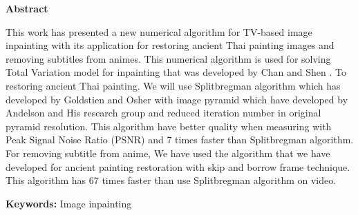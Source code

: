 \thispagestyle{empty}
\vspace{2 cm}
{\huge \bf Abstract}

\vspace{2 cm}
\hspace{1cm} This work has presented a new numerical algorithm for TV-based image inpainting with its application for restoring ancient Thai painting images and removing subtitles from animes. This numerical algorithm is used for solving Total Variation model for inpainting that was developed by Chan and Shen \cite{ref:rof-inpaint-chan-shen}. To restoring ancient Thai painting. We will use Splitbregman algorithm which has developed by Goldstien and Osher \cite{ref:splitbergman-inpaint} with image pyramid which have developed by Andelson and His research group \cite{ref:image-pyramid} and reduced iteration number in original pyramid resolution. This algorithm have better quality when measuring with Peak Signal Noise Ratio (PSNR) and 7 times faster than Splitbregman algorithm. For removing subtitle from anime, We have used the algorithm that we have developed for ancient  painting restoration with skip and borrow frame technique. This algorithm has 67 times faster than use Splitbregman algorithm on video.

\vspace{1 cm}

{\bf{Keywords:}} Image inpainting \\
\newpage